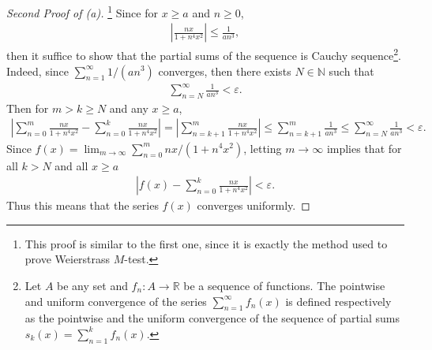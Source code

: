 \documentclass[11pt]{article}
\theoremstyle{definition}
\numberwithin{equation}{subsection}
\begin{document}
\begin{proof}[Second Proof of (a)]\footnote{This proof is similar to the first one, since it is exactly the method used to prove Weierstrass $M$-test.} Since for $x \geq a$ and $n \geq 0$,
\begin{align*}
    \left|\frac{nx}{1 + n^4x^2}\right| \leq \frac{1}{an^3},
\end{align*}
then it suffice to show that the partial sums of the sequence is Cauchy sequence\footnote{Let $A$ be any set and $f_n:A \to \mathbb{R}$ be a sequence of functions. The pointwise and uniform convergence of the series $\sum^\infty_{n=1}f_n(x)$ is defined respectively as the pointwise and the uniform convergence of the sequence of partial sums $s_k(x) = \sum^k_{n=1}f_n(x)$.}. Indeed, since $\sum^\infty_{n=1} 1/\left(an^3\right)$ converges, then there exists $N \in \mathbb{N}$ such that 
\begin{align*}
    \sum^\infty_{n=N} \frac{1}{an^3} < \varepsilon.
\end{align*}
Then for $m > k \geq N$ and any $x \geq a$,
\begin{align*}
    \left|\sum^m_{n=0} \frac{nx}{1 + n^4x^2} - \sum^k_{n=0} \frac{nx}{1 + n^4x^2} \right| = \left|\sum^m_{n=k+1} \frac{nx}{1 + n^4x^2}  \right| \leq \sum^m_{n=k+1} \frac{1}{an^3} \leq \sum^\infty_{n=N} \frac{1}{an^3} < \varepsilon.
\end{align*}
Since $f(x) = \lim_{m\to\infty}\sum^m_{n=0} nx/(1 + n^4x^2)$, letting $m \to \infty$ implies that for all $k > N$ and all $x \geq a$
\begin{align*}
    \left|f(x) - \sum^k_{n=0} \frac{nx}{1 + n^4x^2} \right| < \varepsilon.
\end{align*}
Thus this means that the series $f(x)$ converges uniformly.
\end{proof}

\medskip
\end{document}
